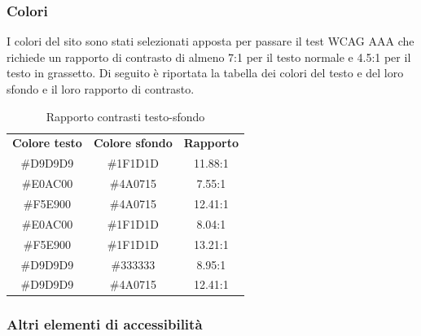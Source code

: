 \documentclass{article}
\begin{document}
			\subsubsection{Colori}
				I colori del sito sono stati selezionati apposta per passare il test WCAG AAA che richiede un rapporto di contrasto di almeno 7:1 per il testo normale e 4.5:1 per il testo in grassetto. Di seguito è riportata la tabella dei colori del testo e del loro sfondo e il loro rapporto di contrasto.
				\captionsetup[table]{name=Tabella}
				\setlength{\tabcolsep}{18pt}
				\renewcommand{\arraystretch}{1.5}
				\begin{table}[htp] %
					\begin{center}
						\caption {Rapporto contrasti testo-sfondo}
						 \normalsize\mdseries
						\begin{tabular}{ c c c }
							\rowcolor{custom}
							\bfseries\color{white} Colore testo & \bfseries\color{white} Colore sfondo & \bfseries\color{white} Rapporto \\
							\#D9D9D9 & \#1F1D1D & 11.88:1  \\ %
							\#E0AC00 & \#4A0715 & 7.55:1  \\ %
							\#F5E900 & \#4A0715 & 12.41:1  \\ %
							\#E0AC00 & \#1F1D1D & 8.04:1  \\ %
							\#F5E900 & \#1F1D1D & 13.21:1  \\ %
							\#D9D9D9 & \#333333 & 8.95:1  \\ %
							\#D9D9D9 & \#4A0715 & 12.41:1  \\ %
						\end{tabular}
					\end{center}
				\end{table}
			\subsubsection{Altri elementi di accessibilità}
\end{document}
